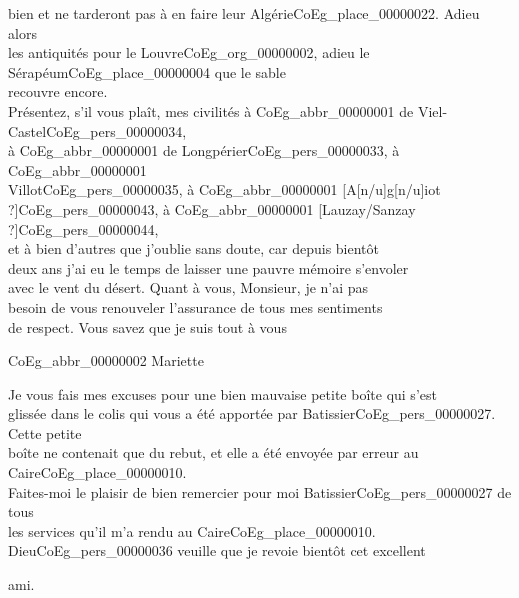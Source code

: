 \documentclass{book}
\begin{document}
bien et ne tarderont pas à en faire leur Algérie\gls{CoEg_place_00000022}. Adieu alors\\
les antiquités pour le Louvre\gls{CoEg_org_00000002}, adieu le Sérapéum\gls{CoEg_place_00000004} que le sable\\
recouvre encore.\\
\indent Présentez, s’il vous plaît, mes civilités à \gls{CoEg_abbr_00000001} de Viel-Castel\gls{CoEg_pers_00000034},\\
à \gls{CoEg_abbr_00000001} de Longpérier\gls{CoEg_pers_00000033}, à \gls{CoEg_abbr_00000001}\\
Villot\gls{CoEg_pers_00000035}, à \gls{CoEg_abbr_00000001} {[A[n/u]g[n/u]iot ?]}\gls{CoEg_pers_00000043}, à \gls{CoEg_abbr_00000001} {[Lauzay/Sanzay ?]}\gls{CoEg_pers_00000044},\\
et à bien d’autres que j’oublie sans doute, car depuis bientôt\\
deux ans j’ai eu le temps de laisser une pauvre mémoire s’envoler\\
avec le vent du désert. Quant à vous, Monsieur, je n’ai pas\\
besoin de vous renouveler l’assurance de tous mes sentiments\\
de respect. Vous savez que je suis tout à vous
\begin{center} \hspace{5cm}\gls{CoEg_abbr_00000002} Mariette\end{center}
Je vous fais mes excuses pour une bien mauvaise petite boîte qui s’est\\
glissée dans le colis qui vous a été apportée par Batissier\gls{CoEg_pers_00000027}. Cette petite\\
boîte ne contenait que du rebut, et elle a été envoyée par erreur au\\
Caire\gls{CoEg_place_00000010}.\\
\indent Faites-moi le plaisir de bien remercier pour moi Batissier\gls{CoEg_pers_00000027} de tous\\
les services qu’il m’a rendu au Caire\gls{CoEg_place_00000010}. Dieu\gls{CoEg_pers_00000036} veuille que je revoie bientôt cet excellent
\begin{flushright}ami.\end{flushright}
\end{document}
